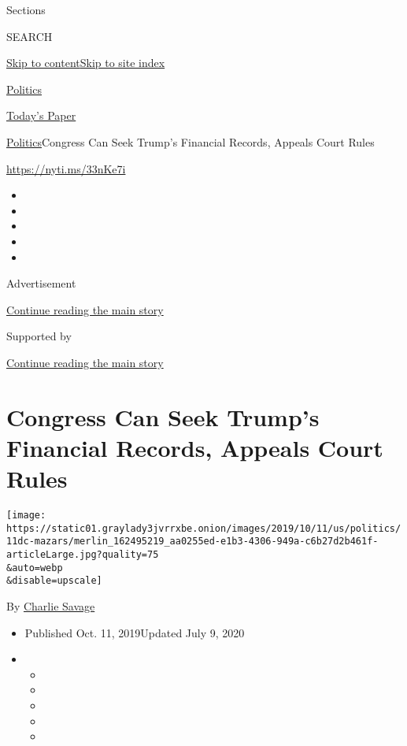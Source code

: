 Sections

SEARCH

\protect\hyperlink{site-content}{Skip to
content}\protect\hyperlink{site-index}{Skip to site index}

\href{https://www.nytimes3xbfgragh.onion/section/politics}{Politics}

\href{https://myaccount.nytimes3xbfgragh.onion/auth/login?response_type=cookie\&client_id=vi}{}

\href{https://www.nytimes3xbfgragh.onion/section/todayspaper}{Today's
Paper}

\href{/section/politics}{Politics}\textbar{}Congress Can Seek Trump's
Financial Records, Appeals Court Rules

\url{https://nyti.ms/33nKe7i}

\begin{itemize}
\item
\item
\item
\item
\item
\end{itemize}

Advertisement

\protect\hyperlink{after-top}{Continue reading the main story}

Supported by

\protect\hyperlink{after-sponsor}{Continue reading the main story}

\hypertarget{congress-can-seek-trumps-financial-records-appeals-court-rules}{%
\section{Congress Can Seek Trump's Financial Records, Appeals Court
Rules}\label{congress-can-seek-trumps-financial-records-appeals-court-rules}}

\texttt{[image: https://static01.graylady3jvrrxbe.onion/images/2019/10/11/us/politics/11dc-mazars/merlin\_162495219\_aa0255ed-e1b3-4306-949a-c6b27d2b461f-articleLarge.jpg?quality=75\\\&auto=webp\\\&disable=upscale]}

By \href{https://www.nytimes3xbfgragh.onion/by/charlie-savage}{Charlie
Savage}

\begin{itemize}
\item
  Published Oct. 11, 2019Updated July 9, 2020
\item
  \begin{itemize}
  \item
  \item
  \item
  \item
  \item
  \end{itemize}
\end{itemize}


